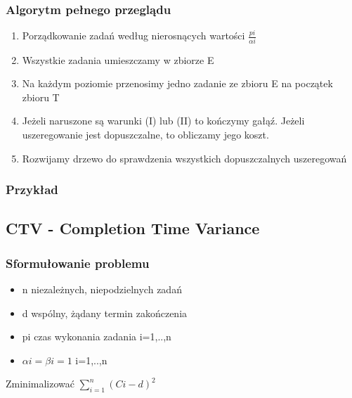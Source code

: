 \documentclass[12pt,a4paper]{article}
\begin{document}
\subsubsection{Algorytm pełnego przeglądu}
\begin{enumerate}
\item Porządkowanie zadań według nierosnących wartości $\frac{pi}{\alpha i}$
\item Wszystkie zadania umieszczamy w zbiorze E
\item Na każdym poziomie przenosimy jedno zadanie ze zbioru E na początek zbioru T
\item Jeżeli naruszone są warunki (I) lub (II) to kończymy gałąź. Jeżeli uszeregowanie jest dopuszczalne, to obliczamy jego koszt.
\item Rozwijamy drzewo do sprawdzenia wszystkich dopuszczalnych uszeregowań
\end{enumerate}
\subsubsection{Przykład}
\subsection{CTV - Completion Time Variance}
\subsubsection{Sformułowanie problemu}
\begin{itemize}
\item n niezależnych, niepodzielnych zadań
\item d wspólny, żądany termin zakończenia
\item pi czas wykonania zadania i=1,..,n
\item $\alpha i = \beta i = 1$ i=1,..,n
\end{itemize}

Zminimalizować $\sum\limits_{i=1}^{n}(Ci-d)^2$
\end{document}

